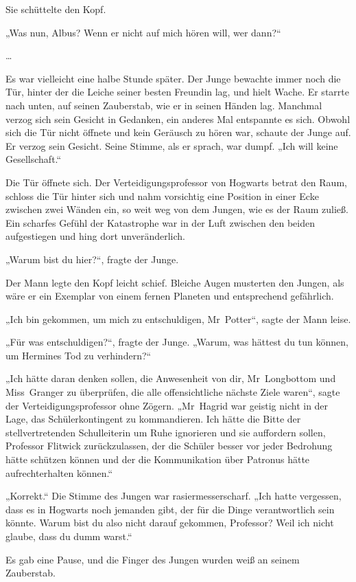 {Sie schüttelte den Kopf.

„Was nun, Albus? Wenn er nicht auf mich hören will, wer dann?“

…

Es war vielleicht eine halbe Stunde später. Der Junge bewachte immer noch die Tür, hinter der die Leiche seiner besten Freundin lag, und hielt Wache. Er starrte nach unten, auf seinen Zauberstab, wie er in seinen Händen lag. Manchmal verzog sich sein Gesicht in Gedanken, ein anderes Mal entspannte es sich. Obwohl sich die Tür nicht öffnete und kein Geräusch zu hören war, schaute der Junge auf. Er verzog sein Gesicht. Seine Stimme, als er sprach, war dumpf. „Ich will keine Gesellschaft.“

Die Tür öffnete sich. Der Verteidigungsprofessor von Hogwarts betrat den Raum, schloss die Tür hinter sich und nahm vorsichtig eine Position in einer Ecke zwischen zwei Wänden ein, so weit weg von dem Jungen, wie es der Raum zuließ. Ein scharfes Gefühl der Katastrophe war in der Luft zwischen den beiden aufgestiegen und hing dort unveränderlich.

„Warum bist du hier?“, fragte der Junge.

Der Mann legte den Kopf leicht schief. Bleiche Augen musterten den Jungen, als wäre er ein Exemplar von einem fernen Planeten und entsprechend gefährlich.

„Ich bin gekommen, um mich zu entschuldigen, Mr~Potter“, sagte der Mann leise.

„Für was entschuldigen?“, fragte der Junge. „Warum, was hättest du tun können, um Hermines Tod zu verhindern?“

„Ich hätte daran denken sollen, die Anwesenheit von dir, Mr~Longbottom und Miss~Granger zu überprüfen, die alle offensichtliche nächste Ziele waren“, sagte der Verteidigungsprofessor ohne Zögern. „Mr~Hagrid war geistig nicht in der Lage, das Schülerkontingent zu kommandieren. Ich hätte die Bitte der stellvertretenden Schulleiterin um Ruhe ignorieren und sie auffordern sollen, Professor Flitwick zurückzulassen, der die Schüler besser vor jeder Bedrohung hätte schützen können und der die Kommunikation über Patronus hätte aufrechterhalten können.“

„Korrekt.“ Die Stimme des Jungen war rasiermesserscharf. „Ich hatte vergessen, dass es in Hogwarts noch jemanden gibt, der für die Dinge verantwortlich sein könnte. Warum bist du also nicht darauf gekommen, Professor? Weil ich nicht glaube, dass du dumm warst.“

Es gab eine Pause, und die Finger des Jungen wurden weiß an seinem Zauberstab.

}
